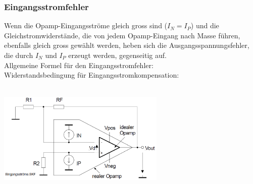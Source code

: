 		\subsubsection{Eingangsstromfehler }
			\begin{minipage}{18cm}
              Wenn die Opamp-Eingangsströme gleich gross sind
              ($I_{N}=I_{P}$) und die Gleichstromwiderstände,
              die von jedem Opamp-Eingang nach Masse führen, 
              ebenfalls gleich gross gewählt werden, heben sich die
              Ausgangsspannungsfehler, die durch $I_{N}$ und $I_{P}$
              erzeugt werden, gegenseitig auf. \\
              Allgemeine Formel für den
              Eingangsstromfehler:
                \hspace{20mm}
                \\ Widerstandsbedingung für Eingangsstromkompensation: \hspace{7.5mm}
            	\\
            \end{minipage}\\
			\includegraphics[width=8cm]{./bilder/eingangsstromfehler.png}

